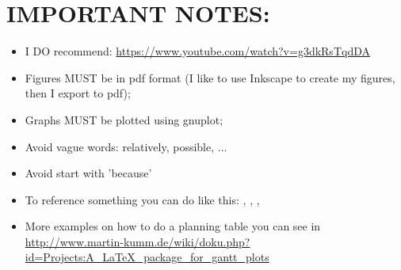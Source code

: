 \newpage
\section*{IMPORTANT NOTES:}
\begin{itemize}
	\item I DO recommend: \url{https://www.youtube.com/watch?v=g3dkRsTqdDA}
	\item Figures MUST be in pdf format (I like to use Inkscape to create my figures, then I export to pdf);
	\item Graphs MUST be plotted using gnuplot; 
	\item Avoid vague words: relatively, possible, ... 
	\item Avoid start with 'because'
	\item To reference something you can do like this: \cite{justyna2015SBRC}, \cite{kerkers2014aims}, \cite{jjsantanna2015IM2,jjsantanna2015IM1}, \cite{santanna2013aims} 
	\item More examples on how to do a planning table you can see in \url{http://www.martin-kumm.de/wiki/doku.php?id=Projects:A_LaTeX_package_for_gantt_plots}
\end{itemize}

